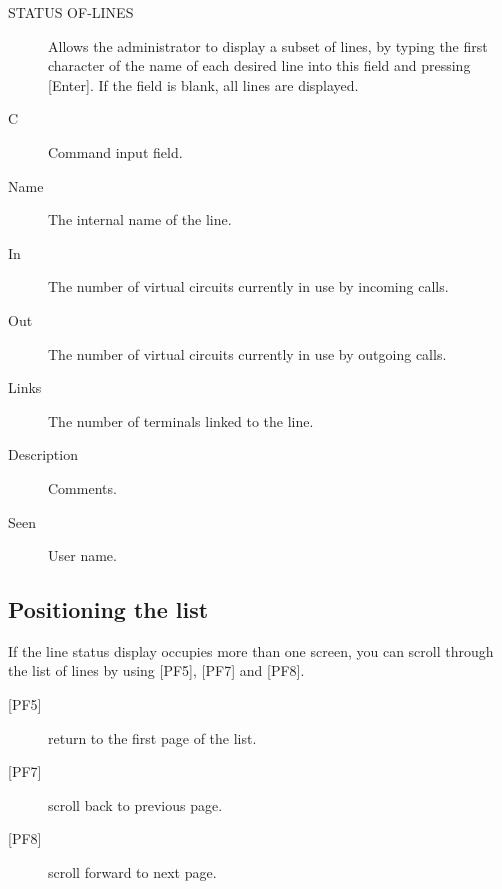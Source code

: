 \documentclass[letterpaper,10pt,english]{sphinxmanual}
\begin{document}

\begin{description}
\item[{STATUS OF-LINES}] \leavevmode
Allows the administrator to display a subset of lines, by typing the
first character of the name of each desired line into this field and
pressing {[}Enter{]}. If the field is blank, all lines are displayed.

\item[{C}] \leavevmode
Command input field.

\item[{Name}] \leavevmode
The internal name of the line.

\item[{In}] \leavevmode
The number of virtual circuits currently in use by incoming calls.

\item[{Out}] \leavevmode
The number of virtual circuits currently in use by outgoing calls.

\item[{Links}] \leavevmode
The number of terminals linked to the line.

\item[{Description}] \leavevmode
Comments.

\item[{Seen}] \leavevmode
User name.

\end{description}


\subsection{Positioning the list}
\label{\detokenize{audit_operations_ and_performance:positioning-the-list}}
If the line status display occupies more than one screen, you can scroll through the list of lines by using {[}PF5{]}, {[}PF7{]} and {[}PF8{]}.
\begin{description}
\item[{{[}PF5{]}}] \leavevmode
return to the first page of the list.

\item[{{[}PF7{]}}] \leavevmode
scroll back to previous page.

\item[{{[}PF8{]}}] \leavevmode
scroll forward to next page.

\end{description}
\end{document}
